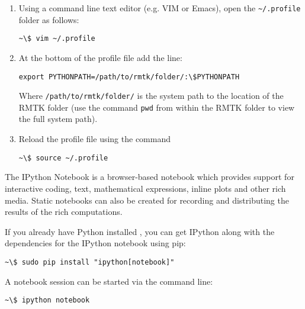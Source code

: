 \begin{enumerate}
\item Using a command line text editor (e.g. VIM or Emacs), open the \verb=~/.profile= folder as follows:

\begin{Verbatim}[frame=single, commandchars=\\\{\}, fontsize=\scriptsize]
~\$ vim ~/.profile
\end{Verbatim}

\item At the bottom of the profile file add the line:

\begin{Verbatim}[frame=single, commandchars=\\\{\}, fontsize=\scriptsize]
export PYTHONPATH=/path/to/rmtk/folder/:\$PYTHONPATH
\end{Verbatim}

Where \verb=/path/to/rmtk/folder/= is the system path to the location of the RMTK folder (use the command \verb=pwd= from within the RMTK folder to view the full system path).

\item Reload the profile file using the command

\begin{Verbatim}[frame=single, commandchars=\\\{\}, fontsize=\scriptsize]
~\$ source ~/.profile
\end{Verbatim}

\end{enumerate}

The IPython Notebook is a browser-based notebook which provides support for interactive coding, text, mathematical expressions, inline plots and other rich media. Static notebooks can also be created for recording and distributing the results of the rich computations.

If you already have Python installed , you can get IPython along with the dependencies for the IPython notebook using pip:

\begin{Verbatim}[frame=single, commandchars=\\\{\}, fontsize=\scriptsize, samepage=true]
~\$ sudo pip install "ipython[notebook]"
\end{Verbatim}

A notebook session can be started via the command line:

\begin{Verbatim}[frame=single, commandchars=\\\{\}, fontsize=\scriptsize, samepage=true]
~\$ ipython notebook
\end{Verbatim}

